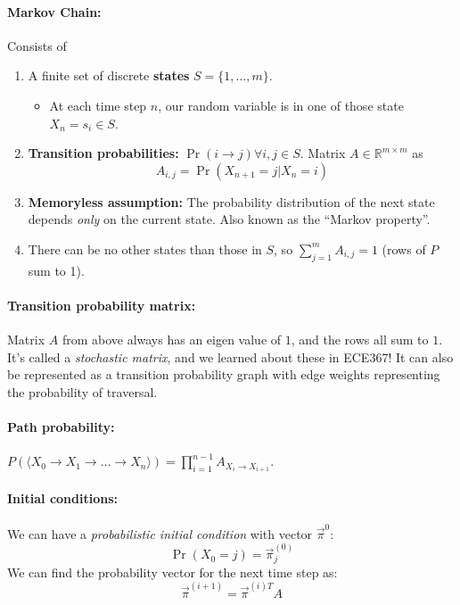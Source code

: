 \documentclass[a4paper,12pt]{report}
\begin{document}
\paragraph{Markov Chain: } Consists of 
\begin{enumerate}
\item A finite set of discrete \textbf{states} $S = \{1, \dots, m\}$.
\begin{itemize}
\item At each time step $n$, our random variable is in one of those state $X_n = s_i \in S$.
\end{itemize}
\item \textbf{Transition probabilities:} $\Pr(i\to j) \forall i,j\in S$. Matrix $A\in \mathbb R^{m\times m}$ as 
\begin{equation}
A_{i,j} = \Pr(X_{n+1} = j | X_n = i)
\end{equation}

\item \textbf{Memoryless assumption:} The probability distribution of the next state depends \textit{only} on the current state. Also known as the ``Markov property''.
\item There can be no other states than those in $S$, so $\sum_{j=1}^{m} A_{i,j} = 1$ (rows of $P$ sum to 1).
\end{enumerate}

\paragraph{Transition probability matrix: } Matrix $A$ from above always has an eigen value of $1$, and the rows all sum to $1$. It's called a \textit{stochastic matrix}, and we learned about these in ECE367! It can also be represented as a transition probability graph with edge weights representing the probability of traversal.

\paragraph{Path probability: } $P(\langle X_0 \to X_1 \to \dots \to X_n\rangle) = \prod_{i=1}^{n-1} A_{X_i \to X_{i+1}}$.

\paragraph{Initial conditions: } We can have a \textit{probabilistic initial condition} with vector $\vec \pi^0$:
\begin{equation}
\Pr(X_0 = j) = \vec \pi_j^{(0)}
\end{equation}
We can find the probability vector for the next time step as:
\begin{equation}
\vec \pi^{(i+1)} = \vec\pi^{(i)T}A
\end{equation}
\end{document}
